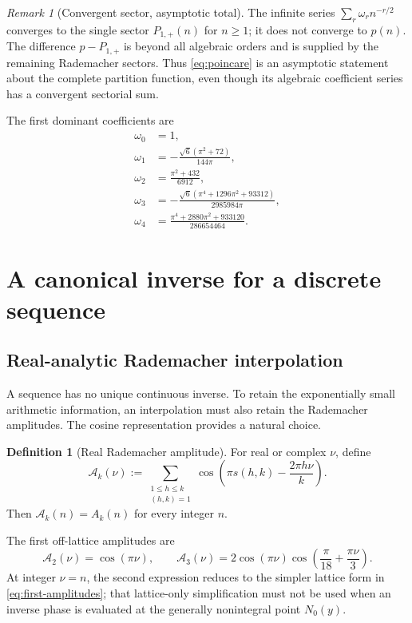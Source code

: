 \documentclass[11pt,a4paper]{article}
\numberwithin{equation}{section}
\theoremstyle{definition}
\newtheorem{definition}[theorem]{Definition}
\theoremstyle{remark}
\newtheorem{remark}[theorem]{Remark}
\newcommand{\Acal}{\mathcal A}
\begin{document}
\begin{remark}[Convergent sector, asymptotic total]\label{rem:convergent-vs-asymptotic}
The infinite series $\sum_r\omega_r n^{-r/2}$ converges to the single sector
$P_{1,+}(n)$ for $n\geq1$; it does not converge to $p(n)$.  The difference
$p-P_{1,+}$ is beyond all algebraic orders and is supplied by the remaining
Rademacher sectors.  Thus \eqref{eq:poincare} is an asymptotic statement about
the complete partition function, even though its algebraic coefficient series
has a convergent sectorial sum.
\end{remark}

The first dominant coefficients are
\begin{align}
 \omega_0&=1,\nonumber\\
 \omega_1&=-\frac{\sqrt6(\pi^2+72)}{144\pi},\nonumber\\
 \omega_2&=\frac{\pi^2+432}{6912},\nonumber\\
 \omega_3&=-\frac{\sqrt6(\pi^4+1296\pi^2+93312)}{2985984\pi},
 \label{eq:omega-first}\\
 \omega_4&=\frac{\pi^4+2880\pi^2+933120}{286654464}.
 \nonumber
\end{align}

\section{A canonical inverse for a discrete sequence}

\subsection{Real-analytic Rademacher interpolation}

A sequence has no unique continuous inverse.  To retain the exponentially
small arithmetic information, an interpolation must also retain the
Rademacher amplitudes.  The cosine representation provides a natural choice.

\begin{definition}[Real Rademacher amplitude]\label{def:real-A}
For real or complex $\nu$, define
\begin{equation}\label{eq:A-real}
 \Acal_k(\nu):=
 \sum_{\substack{1\leq h\leq k\\(h,k)=1}}
 \cos\!\left(\pi s(h,k)-\frac{2\pi h\nu}{k}\right).
\end{equation}
Then $\Acal_k(n)=A_k(n)$ for every integer $n$.
\end{definition}
The first off-lattice amplitudes are
\begin{equation}\label{eq:real-low-amplitudes}
 \Acal_2(\nu)=\cos(\pi\nu),\qquad
 \Acal_3(\nu)=2\cos(\pi\nu)
 \cos\!\left(\frac\pi{18}+\frac{\pi\nu}{3}\right).
\end{equation}
At integer $\nu=n$, the second expression reduces to the simpler lattice form
in \eqref{eq:first-amplitudes}; that lattice-only simplification must not be used
when an inverse phase is evaluated at the generally nonintegral point $N_0(y)$.
\end{document}
